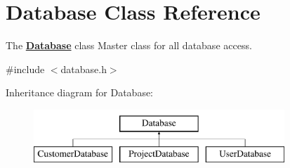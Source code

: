 \hypertarget{classDatabase}{\section{Database Class Reference}
\label{classDatabase}
}


The {\bfseries \hyperlink{classDatabase}{Database}} class Master class for all database access.  




{\ttfamily \#include $<$database.\-h$>$}

Inheritance diagram for Database\-:\begin{figure}[H]
\begin{center}
\leavevmode
\includegraphics[height=2.000000cm]{de/d03/classDatabase}
\end{center}
\end{figure}
